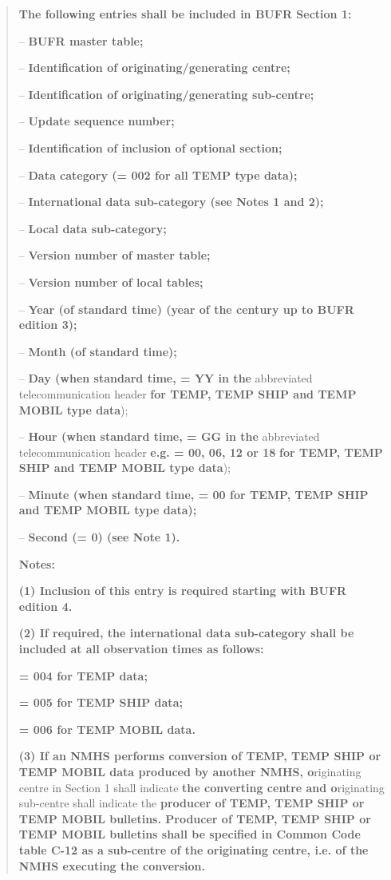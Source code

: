 \begin{quote}
\textbf{The following entries shall be included in BUFR Section 1:}

-- \textbf{BUFR master table;}

-- \textbf{Identification of originating/generating centre;}

-- \textbf{Identification of originating/generating sub-centre;}

-- \textbf{Update sequence number;}

-- \textbf{Identification of inclusion of optional section;}

-- \textbf{Data category (= 002 for all TEMP type data);}

-- \textbf{International data sub-category (see Notes 1 and 2);}

-- \textbf{Local data sub-category;}

-- \textbf{Version number of master table;}

-- \textbf{Version number of local tables;}

-- \textbf{Year (of standard time) (year of the century up to BUFR edition 3);}

-- \textbf{Month (of standard time);}

-- \textbf{Day (when standard time, = YY in the} abbreviated telecommunication header \textbf{for TEMP, TEMP SHIP and TEMP MOBIL type data});

-- \textbf{Hour (when standard time, = GG in the} abbreviated telecommunication header \textbf{e.g. = 00, 06, 12 or 18} \textbf{for TEMP, TEMP SHIP and TEMP MOBIL type data});

-- \textbf{Minute (when standard time, = 00 for TEMP, TEMP SHIP and TEMP MOBIL type data);}

-- \textbf{Second (= 0) (see Note 1).}

\textbf{Notes:}

\textbf{(1) Inclusion of this entry is required starting with BUFR edition 4.}

\textbf{(2) If required, the international data sub-category shall be included at all observation times as follows:}

\textbf{= 004 for TEMP data;}

\textbf{= 005 for TEMP SHIP data;}

\textbf{= 006 for TEMP MOBIL data.}

\textbf{(3) If an NMHS performs conversion of TEMP, TEMP SHIP or TEMP MOBIL data produced by another NMHS, o}riginating centre in Section 1 shall indicate \textbf{the converting centre and o}riginating sub-centre shall indicate the \textbf{producer of TEMP, TEMP SHIP or TEMP MOBIL bulletins. Producer of TEMP, TEMP SHIP or TEMP MOBIL bulletins shall be specified in Common Code table C-12 as a sub-centre of the originating centre, i.e. of the NMHS executing the conversion.}
\end{quote}

